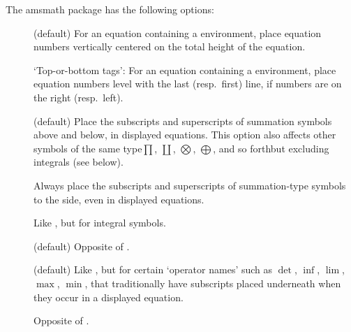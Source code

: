\documentclass[leqno,titlepage,openany]{amsldoc}[1999/12/13]
\newcommand{\nipkg}{\textsf}
\begin{document}
The \nipkg{amsmath} package has the following options:
\begin{description}

\item[] (default) For an equation containing a
 environment, place equation
numbers
vertically centered on the total height of the equation.

\item[] `Top-or-bottom tags': For an equation containing
a  environment, place equation
numbers level with the last
(resp.\ first) line, if numbers are on the right (resp.\ left).

\item[] (default) Place the subscripts and
superscripts\relax
{} of summation symbols
above and below, in displayed equations. This option also affects other
symbols of the same type\mdash $\prod$, $\coprod$, $\bigotimes$,
$\bigoplus$, and so forth\mdash but excluding integrals (see below).

\item[] Always place the subscripts and superscripts of
summation-type symbols to the side, even in displayed equations.

\item[] Like , but for
integral symbols.

\item[] (default) Opposite of .

\item[] (default) Like , but for certain
`operator names' such as $\det$, $\inf$, $\lim$, $\max$, $\min$, that
traditionally have subscripts%
 placed underneath when
they occur in a displayed equation.

\item[] Opposite of .

\end{description}

\goodbreak

\begin{description}
\item[]
\item[]
\item[]
\end{description}
\end{document}
